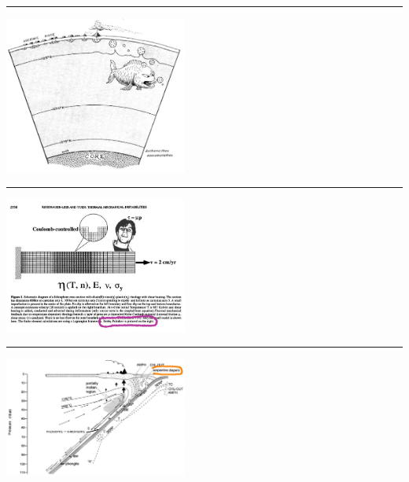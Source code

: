 \par\noindent\rule{\textwidth}{0.4pt}
\begin{center}
\includegraphics[width=6cm]{images/interesting/vidal} {\captionfont \cite{vidal}}
\end{center}


\par\noindent\rule{\textwidth}{0.4pt}
\begin{center}
\includegraphics[width=6cm]{images/interesting/reyu98} {\captionfont \cite{reyu98}}
\end{center}

\par\noindent\rule{\textwidth}{0.4pt}
\begin{center}
\includegraphics[width=6cm]{images/interesting/scpo98} {\captionfont \cite{scpo98}}
\end{center}





